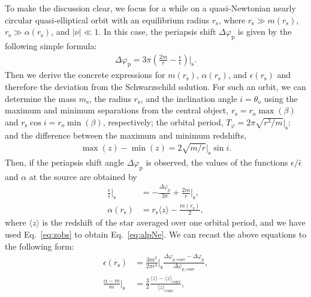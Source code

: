 \documentclass[aps,11pt,nofootinbib,preprintnumbers,groupedaddress,superscriptaddress]{revtex4-2}
\begin{document}
To make the discussion clear, we focus for a while on a quasi-Newtonian nearly circular 
quasi-elliptical
orbit with an equilibrium radius $r_{\mathrm{s}}$, where $r_{\mathrm{s}}\gg m(r_{\mathrm{s}})$, $r_{\mathrm{s}}\gg \alpha(r_{\mathrm{s}})$, and $|\nu|\ll 1$. 
In this case, the periapsis shift $\Delta \varphi_{\mathrm{p}}$ is given by the following simple formula:
\begin{align}
\label{eq:shiftNe}
\Delta \varphi_{\mathrm{p}}=3\pi \left(
\frac{2m}{r}-\frac{\epsilon}{\bar{\epsilon}}
\right)\!\bigg|_{\mathrm{s}}.
\end{align}
Then we derive the concrete expressions for $m(r_{\mathrm{s}})$, $\alpha(r_{\mathrm{s}})$, and $\epsilon(r_{\mathrm{s}})$ and therefore the deviation from the Schwarzschild solution. 
For such an orbit, we can determine 
the mass $m_{\mathrm{s}}$,
the radius $r_{\mathrm{s}}$, and the inclination angle $i=\theta_{\mathrm{o}}$ using the maximum and minimum separations from the central object, 
$r_{\mathrm{s}}=r_{\mathrm{o}} \max(\beta)$ and 
$r_{\mathrm{s}} \cos i=r_{\mathrm{o}} \min(\beta)$,
respectively; 
the orbital period, $T_\varphi=2\pi \sqrt{r^3/m}|_{\mathrm{s}}$; and 
the difference between the maximum and minimum redshifts, 
\begin{align}
\max(z)-\min(z)=2 \sqrt{m/r}|_{\mathrm{s}}\sin i.
\end{align}
Then, 
if the periapsis shift angle $\Delta \varphi_{\mathrm{p}}$ is observed, 
the values of the functions $\epsilon/\bar{\epsilon}$ and $\alpha$ at the source are obtained by
\begin{align}
\frac{\epsilon}{\bar{\epsilon}}\Big|_{\mathrm{s}}
&=-\frac{\Delta \varphi_{\mathrm{p}}}{3\pi}+\frac{2m}{r}\Big|_{\mathrm{s}},
\\
\label{eq:alpNe}
\alpha(r_{\mathrm{s}}) &=r_{\mathrm{s}} 
\langle z\rangle
-\frac{m(r_{\mathrm{s}})}{2},
\end{align}
where 
$\langle z\rangle$
is the redshift of the star averaged over one orbital period, 
and we have used Eq.~\eqref{eq:zobs} to obtain Eq.~\eqref{eq:alpNe}.
We can recast the above equations to the following form:
\begin{align}
\label{eq:epNewt}
\epsilon(r_{\mathrm{s}})&=
\frac{3m^2}{2\pi r^4}\bigg|_{\mathrm{s}} \frac{
\Delta \varphi_{\mathrm{p},\mathrm{conv}}
-\Delta \varphi_{\mathrm{p}}}{
\Delta \varphi_{\mathrm{p}, \mathrm{conv}}
},
\\
\frac{\alpha-m}{m}\Big|_{\mathrm{s}}
&=\frac{3}{2} \frac{
\langle z\rangle
-\langle z\rangle_{\mathrm{conv}}
}{
\langle z\rangle_{\mathrm{conv}}},
\end{align}
\end{document}
